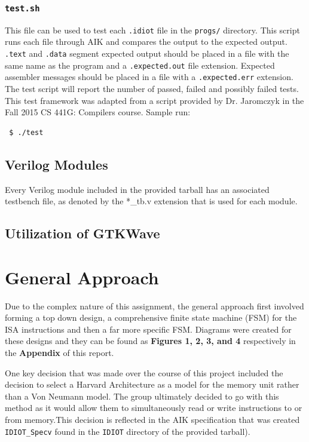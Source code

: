 \documentclass[conference]{IEEEtran}
\begin{document}
\subsubsection{\texttt{test.sh}}
This file can be used to test each \texttt{.idiot} file in the \texttt{progs/}
directory. This script runs each file through AIK and compares the output to
the expected output. \texttt{.text} and \texttt{.data} segment expected
output should be placed in a file with the same name as the program and a 
\texttt{.expected.out} file extension. Expected assembler messages should
be placed in a file with a \texttt{.expected.err} extension. The test script
will report the number of passed, failed and possibly failed tests. This test
framework was adapted from a script provided by Dr. Jaromczyk in the Fall
2015 CS 441G: Compilers course. Sample run:
\begin{verbatim}
 $ ./test
\end{verbatim}

\subsection{Verilog Modules}
Every Verilog module included in the provided tarball has an associated
testbench file, as denoted by the *\_tb.v extension that is used for each
module.  

\subsection{Utilization of GTKWave}



\section{General Approach}
Due to the complex nature of this assignment, the general approach 
first involved forming a top down design, a comprehensive finite
state machine (FSM) for the ISA instructions and then a far more specific
FSM. Diagrams were created for these designs and they can be 
found as \textbf{Figures 1, 2, 3, and 4} respectively in the \textbf{Appendix} 
of this report. 

One key decision that was made over the course of this project included 
the decision to select a Harvard Architecture as a model for the memory unit
rather than a Von Neumann model. The group ultimately decided to go 
with this method as it would allow them to simultaneously read or write
instructions to or from memory.This decision is reflected in the AIK 
specification that was created \texttt{IDIOT\_Specv} found in the \texttt{IDIOT}
directory of the provided tarball).
\end{document}
